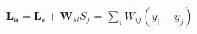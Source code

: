 \documentclass[preview]{standalone}
\begin{document}
\begin{align*}
\mathbf{ L_a } = \mathbf{L_s} + \mathbf{W}_{sl} S_j  = \sum_i W_{ij}(y_i - y_j)
\end{align*}
\end{document}
